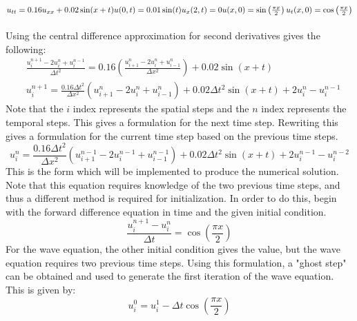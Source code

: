 \documentclass{article}
\begin{document}
\subsection*{$u_{tt} = 0.16u_{xx} + 0.02\sin(x+t)\\u(0,t) = 0.01\sin(t)\\u_x(2,t) = 0\\u(x,0) = \sin\left(\frac{\pi x}{2}\right)\\u_t(x,0) = \cos\left(\frac{\pi x}{2}\right)$}
Using the central difference approximation for second derivatives gives the following:
\begin{equation}
    \begin{aligned}
        &\frac{u_i^{n+1} - 2u_i^n + u_i^{n-1}}{\Delta t^2} = 0.16\left(\frac{u_{i+1}^n - 2u_i^n + u_{i-1}^n}{\Delta x^2}\right) + 0.02\sin\left(x+t\right)\\
        &u_i^{n+1} = \frac{0.16\Delta t^2}{\Delta x^2}\left(u_{i+1}^n - 2u_i^n + u_{i-1}^n\right) + 0.02\Delta t^2\sin\left(x+t\right) + 2u_i^n - u_i^{n-1}
    \end{aligned}
\end{equation}
Note that the $i$ index represents the spatial steps and the $n$ index represents the temporal steps. This gives a formulation for the next time step. Rewriting this gives a formulation for the current time step based on the previous time steps.
\begin{equation}
    u_i^{n} = \frac{0.16\Delta t^2}{\Delta x^2}\left(u_{i+1}^{n-1} - 2u_i^{n-1} + u_{i-1}^{n-1}\right) + 0.02\Delta t^2\sin\left(x+t\right) + 2u_i^{n-1} - u_i^{n-2}
\end{equation}
This is the form which will be implemented to produce the numerical solution. Note that this equation requires knowledge of the two previous time steps, and thus a different method is required for initialization. In order to do this, begin with the forward difference equation in time and the given initial condition.
\begin{equation}
    \frac{u_i^{n+1} - u_i^n}{\Delta t} = \cos\left(\frac{\pi x}{2}\right)
\end{equation}
For the wave equation, the other initial condition gives the value, but the wave equation requires two previous time steps. Using this formulation, a "ghost step" can be obtained and used to generate the first iteration of the wave equation. This is given by:
\begin{equation}
    u_i^0 = u_i^1 - \Delta t\cos\left(\frac{\pi x}{2}\right)
\end{equation}
\end{document}
